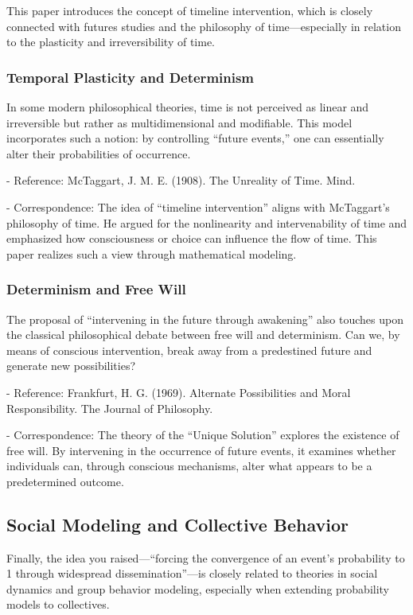 \documentclass{article}
\begin{document}
This paper introduces the concept of timeline intervention, which is closely connected with futures studies and the philosophy of time—especially in relation to the plasticity and irreversibility of time.

\subsubsection{Temporal Plasticity and Determinism}

In some modern philosophical theories, time is not perceived as linear and irreversible but rather as multidimensional and modifiable. This model incorporates such a notion: by controlling “future events,” one can essentially alter their probabilities of occurrence.

- Reference: McTaggart, J. M. E. (1908). The Unreality of Time. Mind.

- Correspondence: The idea of “timeline intervention” aligns with McTaggart’s philosophy of time. He argued for the nonlinearity and intervenability of time and emphasized how consciousness or choice can influence the flow of time. This paper realizes such a view through mathematical modeling.

\subsubsection{Determinism and Free Will}

The proposal of “intervening in the future through awakening” also touches upon the classical philosophical debate between free will and determinism. Can we, by means of conscious intervention, break away from a predestined future and generate new possibilities?

- Reference: Frankfurt, H. G. (1969). Alternate Possibilities and Moral Responsibility. The Journal of Philosophy.

- Correspondence: The theory of the “Unique Solution” explores the existence of free will. By intervening in the occurrence of future events, it examines whether individuals can, through conscious mechanisms, alter what appears to be a predetermined outcome.

\subsection{Social Modeling and Collective Behavior}

Finally, the idea you raised—“forcing the convergence of an event’s probability to 1 through widespread dissemination”—is closely related to theories in social dynamics and group behavior modeling, especially when extending probability models to collectives.
\end{document}
